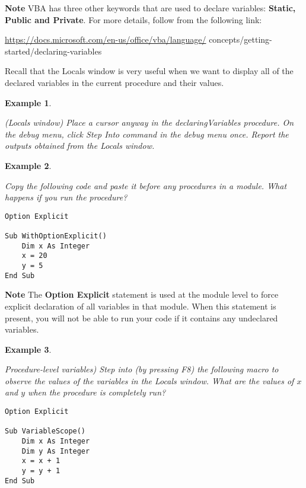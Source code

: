 \documentclass[
]{article}
\theoremstyle{definition}
\theoremstyle{definition}
\newtheorem{example}{Example}[section]
\theoremstyle{definition}
\theoremstyle{definition}
\theoremstyle{remark}
\begin{document}
\textbf{Note} VBA has three other keywords that are used to declare
variables: \textbf{Static, Public and Private}. For more details, follow from
the following link:

\url{https://docs.microsoft.com/en-us/office/vba/language/}
concepts/getting-started/declaring-variables

Recall that the Locals window is very useful when we want to display all
of the declared variables in the current procedure and their values.

\begin{example}
\protect\hypertarget{exm:unlabeled-div-23}{}\label{exm:unlabeled-div-23}

\emph{(Locals window) Place a cursor anyway in the
declaringVariables procedure. On the debug menu, click Step Into command
in the debug menu once. Report the outputs obtained from the Locals
window.}

\end{example}

\begin{example}
\protect\hypertarget{exm:unlabeled-div-24}{}\label{exm:unlabeled-div-24}

\emph{Copy the following code and paste it before any
procedures in a module. What happens if you run the procedure?}

\end{example}

\begin{verbatim}
Option Explicit

Sub WithOptionExplicit()
    Dim x As Integer
    x = 20
    y = 5
End Sub
\end{verbatim}

\textbf{Note} The \textbf{Option Explicit} statement is used at the module level
to force explicit declaration of all variables in that module. When this
statement is present, you will not be able to run your code if it
contains any undeclared variables.

\begin{example}
\protect\hypertarget{exm:unlabeled-div-25}{}\label{exm:unlabeled-div-25}

\emph{Procedure-level variables) Step into (by pressing F8)
the following macro to observe the values of the variables in the Locals
window. What are the values of \(x\) and \(y\) when the procedure is
completely run?}

\end{example}

\begin{verbatim}
Option Explicit

Sub VariableScope()
    Dim x As Integer
    Dim y As Integer
    x = x + 1
    y = y + 1
End Sub
\end{verbatim}
\end{document}
